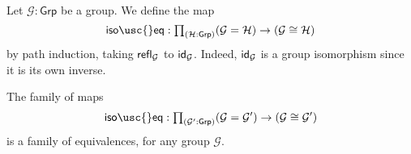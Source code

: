 \begin{defn}
Let $\mathcal{G}:\mathsf{Grp}$ be a group. We define the map
\begin{equation*}
\mathsf{iso\usc{}eq} : \prd{\mathcal{H}:\mathsf{Grp}}(\mathcal{G}=\mathcal{H})\to (\mathcal{G}\cong\mathcal{H})
\end{equation*}
by path induction, taking $\refl{\mathcal{G}}$ to $\idfunc[\mathcal{G}]$. Indeed, $\idfunc[\mathcal{G}]$ is a group isomorphism since it is its own inverse.
\end{defn}

\begin{thm}
The family of maps
\begin{equation*}
\mathsf{iso\usc{}eq} : \prd{\mathcal{G}':\mathsf{Grp}}(\mathcal{G}=\mathcal{G}')\to (\mathcal{G}\cong\mathcal{G}')
\end{equation*}
is a family of equivalences, for any group $\mathcal{G}$.
\end{thm}

